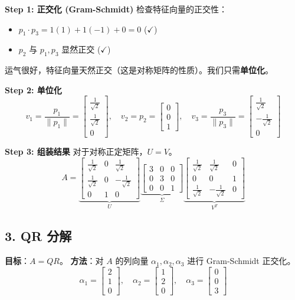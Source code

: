 \documentclass[11pt,a4paper]{ctexart}
\theoremstyle{definition}
\theoremstyle{remark}
\begin{document}
\textbf{Step 1: 正交化 (Gram-Schmidt)}
检查特征向量的正交性：
\begin{itemize}
    \item $p_1 \cdot p_3 = 1(1) + 1(-1) + 0 = 0$ ($\checkmark$)
    \item $p_2$ 与 $p_1, p_3$ 显然正交 ($\checkmark$)
\end{itemize}
运气很好，特征向量天然正交（这是对称矩阵的性质）。我们只需\textbf{单位化}。

\textbf{Step 2: 单位化}
\[
v_1 = \frac{p_1}{\|p_1\|} = \begin{bmatrix} \frac{1}{\sqrt{2}} \\ \frac{1}{\sqrt{2}} \\ 0 \end{bmatrix}, \quad
v_2 = p_2 = \begin{bmatrix} 0 \\ 0 \\ 1 \end{bmatrix}, \quad
v_3 = \frac{p_3}{\|p_3\|} = \begin{bmatrix} \frac{1}{\sqrt{2}} \\ -\frac{1}{\sqrt{2}} \\ 0 \end{bmatrix}
\]

\textbf{Step 3: 组装结果}
对于对称正定矩阵，$U=V$。
\[
A = \underbrace{\begin{bmatrix} \frac{1}{\sqrt{2}} & 0 & \frac{1}{\sqrt{2}} \\ \frac{1}{\sqrt{2}} & 0 & -\frac{1}{\sqrt{2}} \\ 0 & 1 & 0 \end{bmatrix}}_{U}
\underbrace{\begin{bmatrix} 3 & 0 & 0 \\ 0 & 3 & 0 \\ 0 & 0 & 1 \end{bmatrix}}_{\Sigma}
\underbrace{\begin{bmatrix} \frac{1}{\sqrt{2}} & \frac{1}{\sqrt{2}} & 0 \\ 0 & 0 & 1 \\ \frac{1}{\sqrt{2}} & -\frac{1}{\sqrt{2}} & 0 \end{bmatrix}}_{V^T}
\]

\subsection{3. QR 分解}
\textbf{目标}：$A = Q R$。
\textbf{方法}：对 $A$ 的列向量 $\alpha_1, \alpha_2, \alpha_3$ 进行 Gram-Schmidt 正交化。
\[
\alpha_1 = \begin{bmatrix} 2 \\ 1 \\ 0 \end{bmatrix}, \quad
\alpha_2 = \begin{bmatrix} 1 \\ 2 \\ 0 \end{bmatrix}, \quad
\alpha_3 = \begin{bmatrix} 0 \\ 0 \\ 3 \end{bmatrix}
\]
\end{document}

